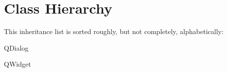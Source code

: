 \section{Class Hierarchy}
This inheritance list is sorted roughly, but not completely, alphabetically\+:\begin{DoxyCompactList}
\item Q\+Dialog\begin{DoxyCompactList}
\item {}
\end{DoxyCompactList}
\item Q\+Widget\begin{DoxyCompactList}
\item {}
\end{DoxyCompactList}
\end{DoxyCompactList}
